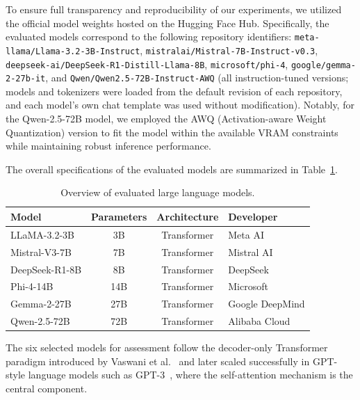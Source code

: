 \documentclass[10pt,letterpaper]{article}
\begin{document}
To ensure full transparency and reproducibility of our experiments, we utilized the official model weights hosted on the Hugging Face Hub. Specifically, the evaluated models correspond to the following repository identifiers: \texttt{meta-llama/Llama-3.2-3B-Instruct}, \texttt{mistralai/Mistral-7B-Instruct-v0.3}, \texttt{deepseek-ai/DeepSeek-R1-Distill-Llama-8B}, \texttt{microsoft/phi-4}, \texttt{google/gemma-2-27b-it}, and \texttt{Qwen/Qwen2.5-72B-Instruct-AWQ} (all instruction-tuned versions; models and tokenizers were loaded from the default revision of each repository, and each model's own chat template was used without modification). Notably, for the Qwen-2.5-72B model, we employed the AWQ (Activation-aware Weight Quantization) version to fit the model within the available VRAM constraints while maintaining robust inference performance.

The overall specifications of the evaluated models are summarized in Table~\ref{tab:models}.

\begin{table}[!t]
\centering
\small
\caption{Overview of evaluated large language models.}
\label{tab:models}
\renewcommand{\arraystretch}{1.2}
\setlength{\tabcolsep}{6pt}

\begin{tabularx}{\columnwidth}{|l|c|c|X|}
\hline
\textbf{Model} & \textbf{Parameters} & \textbf{Architecture} & \textbf{Developer} \\\hline
LLaMA-3.2-3B   & 3B  & Transformer        & Meta AI \\\hline
Mistral-V3-7B  & 7B  & Transformer        & Mistral AI \\\hline
DeepSeek-R1-8B & 8B  & Transformer        & DeepSeek \\\hline
Phi-4-14B      & 14B & Transformer        & Microsoft \\\hline
Gemma-2-27B    & 27B & Transformer        & Google DeepMind \\\hline
Qwen-2.5-72B   & 72B & Transformer        & Alibaba Cloud \\\hline
\end{tabularx}

\end{table}


The six selected models for assessment follow the decoder-only Transformer paradigm introduced by Vaswani et al.~\cite{b54} and later scaled successfully in GPT-style language models such as GPT-3~\cite{b55}, where the self-attention mechanism is the central component.
\end{document}
